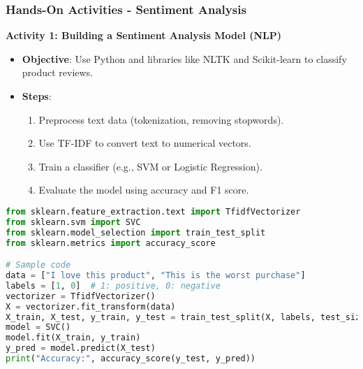 \documentclass[aspectratio=169]{beamer}
\begin{document}
\begin{frame}[fragile]
  \frametitle{Hands-On Activities - Sentiment Analysis}
  \textbf{Activity 1: Building a Sentiment Analysis Model (NLP)}
  \begin{itemize}
    \item \textbf{Objective}: Use Python and libraries like NLTK and Scikit-learn to classify product reviews.
    \item \textbf{Steps}:
      \begin{enumerate}
        \item Preprocess text data (tokenization, removing stopwords).
        \item Use TF-IDF to convert text to numerical vectors.
        \item Train a classifier (e.g., SVM or Logistic Regression).
        \item Evaluate the model using accuracy and F1 score.
      \end{enumerate}
  \end{itemize}

  \begin{lstlisting}[language=Python]
from sklearn.feature_extraction.text import TfidfVectorizer
from sklearn.svm import SVC
from sklearn.model_selection import train_test_split
from sklearn.metrics import accuracy_score

# Sample code
data = ["I love this product", "This is the worst purchase"]
labels = [1, 0]  # 1: positive, 0: negative
vectorizer = TfidfVectorizer()
X = vectorizer.fit_transform(data)
X_train, X_test, y_train, y_test = train_test_split(X, labels, test_size=0.2)
model = SVC()
model.fit(X_train, y_train)
y_pred = model.predict(X_test)
print("Accuracy:", accuracy_score(y_test, y_pred))
  \end{lstlisting}
\end{frame}
\end{document}
